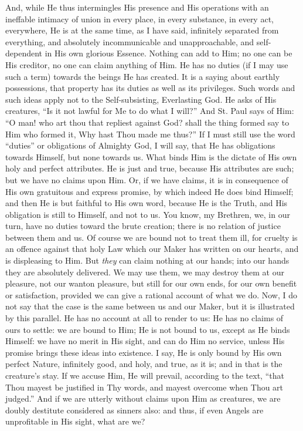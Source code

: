 And, while He thus intermingles His presence and His
operations with an ineffable intimacy of union in every
place, in every substance, in every act, everywhere, He
is at the same time, as I have said, infinitely separated
from everything, and absolutely incommunicable and
unapproachable, and self-dependent in His own glorious
Essence. Nothing can add to Him; no one can be His
creditor, no one can claim anything of Him. He has no
duties (if I may use such a term) towards the beings He
has created. It is a saying about earthly possessions,
that property has its duties as well as its privileges.
Such words and such ideas apply not to the
Self-subsisting, Everlasting God. He asks of His
creatures, ``Is it not lawful for Me to do what I
will?'' And St. Paul says of Him: ``O man! who art thou
that repliest against God? shall the thing formed say to
Him who formed it, Why hast Thou made me thus?'' If I
must still use the word ``duties'' or obligations
of Almighty God, I will say, that He has obligations
towards Himself, but none towards us. What binds Him is
the dictate of His own holy and perfect attributes. He is
just and true, because His attributes are such; but we
have no claims upon Him. Or, if we have claims, it is in
consequence of His own gratuitous and express promise, by
which indeed He does bind Himself; and then He is but
faithful to His own word, because He is the Truth, and
His obligation is still to Himself, and not to us. You
know, my Brethren, we, in our turn, have no duties toward
the brute creation; there is no relation of justice
between them and us. Of course we are bound not to treat
them ill, for cruelty is an offence against that holy Law
which our Maker has written on our hearts, and is
displeasing to Him. But \emph{they} can claim nothing at
our hands; into our hands they are absolutely delivered.
We may use them, we may destroy them at our pleasure, not
our wanton pleasure, but still for our own ends, for our
own benefit or satisfaction, provided we can give a
rational account of what we do. Now, I do not say that
the case is the same between us and our Maker, but it is
illustrated by this parallel. He has no account at all to
render to us: He has no claims of ours to settle: we are
bound to Him; He is not bound to us, except as He binds
Himself: we have no merit in His sight, and can do Him no
service, unless His promise brings these ideas into
existence. I say, He is only bound by His own perfect
Nature, infinitely good, and holy, and true, as it is;
and in that is the creature's stay. If we accuse Him, He
will prevail, according to the text, ``that Thou
mayest be justified in Thy words, and mayest overcome
when Thou art judged.'' And if we are utterly without
claims upon Him as creatures, we are doubly destitute
considered as sinners also: and thus, if even Angels are
unprofitable in His sight, what are we?

